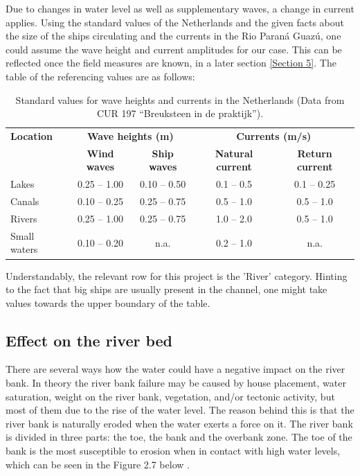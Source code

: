 Due to changes in water level as well as supplementary waves, a change in current applies. Using the standard values of the Netherlands and the given facts about the size of the ships circulating and the currents in the Rio Paraná Guazú, one could assume the wave height and current amplitudes for our case. This can be reflected once the field measures are known, in a later section \ref{Section 5}.
The table of the referencing values are as follows:

\begin{table}[H]
    \centering
    \caption{Standard values for wave heights and currents in the Netherlands (Data from CUR 197 ``Breuksteen in de praktijk'').}
    \label{tab:standard_values}
    \begin{tabular}{lcccc}
        \toprule
        \textbf{Location} & \multicolumn{2}{c}{\textbf{Wave heights (m)}} & \multicolumn{2}{c}{\textbf{Currents (m/s)}} \\
        \cmidrule(lr){2-3} \cmidrule(l){4-5}
        & \textbf{Wind waves} & \textbf{Ship waves} & \textbf{Natural current} & \textbf{Return current} \\
        \midrule
        Lakes          & 0.25 -- 1.00  & 0.10 -- 0.50  & 0.1 -- 0.5  & 0.1 -- 0.25 \\
        Canals         & 0.10 -- 0.25  & 0.25 -- 0.75  & 0.5 -- 1.0  & 0.5 -- 1.0  \\
        Rivers         & 0.25 -- 1.00  & 0.25 -- 0.75  & 1.0 -- 2.0  & 0.5 -- 1.0  \\
        Small waters   & 0.10 -- 0.20  & n.a.          & 0.2 -- 1.0  & n.a.       \\
        \bottomrule
    \end{tabular}
\end{table}


Understandably, the relevant row for this project is the 'River' category. Hinting to the fact that big ships are usually present in the channel, one might take values towards the upper boundary of the table.


\subsection{Effect on the river bed}
\label{chap 6: effect on the river bed}
There are several ways how the water could have a negative impact on the river bank. In theory the river bank failure may be caused by house placement, water saturation, weight on the river bank, vegetation, and/or tectonic activity, but most of them due to the rise of the water level. The reason behind this is that the river bank is naturally eroded when the water exerts a force on it.
The river bank is divided in three parts: the toe, the bank and the overbank zone. The toe of the bank is the most susceptible to erosion when in contact with high water levels, which can be seen in the Figure 2.7 below \autocite{australiaRiverbankCollapse}.

